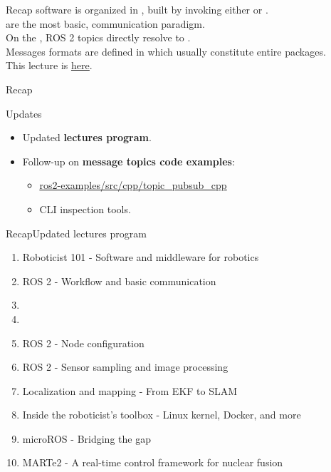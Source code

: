 
\begin{frame}{Recap}
	 software is organized in , built by  invoking either  or .\\
	\bigskip
	 are the most basic,  communication paradigm.\\
	On the , ROS 2 topics directly resolve to .\\
	\bigskip
	Messages formats are defined in  which usually constitute entire packages.\\
	\bigskip
	This lecture is \href{https://github.com/robmasocco/DAFN24_Robotics_3}{\color{blue}\underline{here}}.
\end{frame}
\begin{frame}{Recap}
	\begin{block}{Updates}
		\begin{itemize}
			\item Updated \textbf{lectures program}.
			\item Follow-up on \textbf{message topics code examples}:
			      \begin{itemize}
				      \item \href{https://github.com/IntelligentSystemsLabUTV/ros2-examples/tree/humble/src/cpp/topic_pubsub_cpp}{\color{blue}\underline{ros2-examples/src/cpp/topic\_pubsub\_cpp}}
				      \item CLI inspection tools.
			      \end{itemize}
		\end{itemize}
	\end{block}
\end{frame}
\begin{frame}{Recap}{Updated lectures program}
	\begin{enumerate}
		\item Roboticist 101 - Software and middleware for robotics
		\item ROS 2 - Workflow and basic communication
		\item {}
		\item {}
		\item ROS 2 - Node configuration
		\item ROS 2 - Sensor sampling and image processing
		\item Localization and mapping - From EKF to SLAM
		\item Inside the roboticist's toolbox - Linux kernel, Docker, and more
		\item microROS - Bridging the gap
		\item MARTe2 - A real-time control framework for nuclear fusion
	\end{enumerate}
\end{frame}
